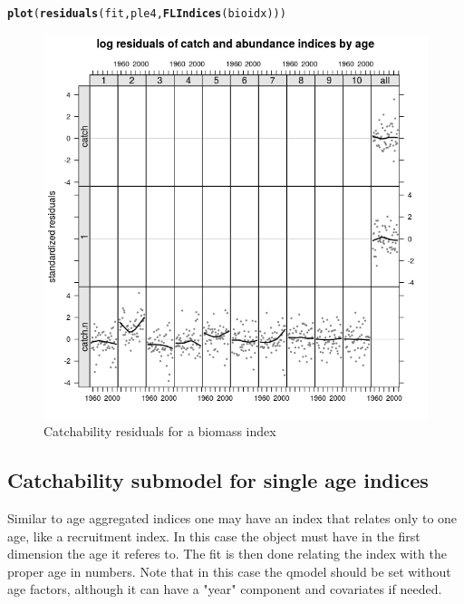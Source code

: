 \documentclass[a4paper,english,10pt]{article}\usepackage[]{graphicx}\usepackage[]{color}
\makeatletter
\def\maxwidth{ %
  \ifdim\Gin@nat@width>\linewidth
    \linewidth
  \else
    \Gin@nat@width
  \fi
}
\newcommand{\hlstd}[1]{\textcolor[rgb]{0.345,0.345,0.345}{#1}}%
\newcommand{\hlkwd}[1]{\textcolor[rgb]{0.737,0.353,0.396}{\textbf{#1}}}%
\newenvironment{kframe}{%
 \def\at@end@of@kframe{}%
 \ifinner\ifhmode%
  \def\at@end@of@kframe{\end{minipage}}%
  \begin{minipage}{\columnwidth}%
 \fi\fi%
 \def\FrameCommand##1{\hskip\@totalleftmargin \hskip-\fboxsep
 \colorbox{shadecolor}{##1}\hskip-\fboxsep
     \hskip-\linewidth \hskip-\@totalleftmargin \hskip\columnwidth}%
 \MakeFramed {\advance\hsize-\width
   \@totalleftmargin\z@ \linewidth\hsize
   \@setminipage}}%
 {\par\unskip\endMakeFramed%
 \at@end@of@kframe}
\newenvironment{knitrout}{}{} %
\makeatother
\begin{document}
\begin{knitrout}
\color{fgcolor}\begin{kframe}
\begin{alltt}
\hlkwd{plot}\hlstd{(}\hlkwd{residuals}\hlstd{(fit, ple4,} \hlkwd{FLIndices}\hlstd{(bioidx)))}
\end{alltt}
\end{kframe}\begin{figure}[H]

{\centering \includegraphics[width=\maxwidth]{figure/resbio2-1} 

}

\caption[Catchability residuals for a biomass index]{Catchability residuals for a biomass index}\label{fig:resbio2}
\end{figure}


\end{knitrout}

\subsection{Catchability submodel for single age indices}

Similar to age aggregated indices one may have an index that relates only to one age, like a recruitment index. In this case the  object must have in the first dimension the age it referes to. The fit is then done relating the index with the proper age in numbers. Note that in this case the qmodel should be set without age factors, although it can have a "year" component and covariates if needed.
\end{document}
